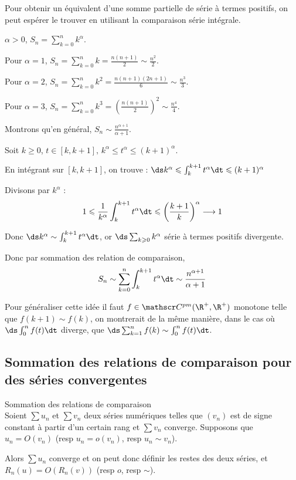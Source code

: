 \begin{exemple}
    Pour obtenir un équivalent d'une somme partielle de série à termes positifs, 
    on peut espérer le trouver en utilisant la comparaison série intégrale.

    $\alpha > 0$, $\displaystyle S_n = \sum_{k = 0 }^{n } k^\alpha$. 

    Pour $\alpha = 1$, $\displaystyle S_n = \sum_{k = 0 }^{n } k = \frac{n(n + 1)}{2} \sim \frac{n^2}{2}$.

    Pour $\alpha = 2$, $\displaystyle S_n = \sum_{k = 0 }^{n } k^2 = \frac{n(n + 1)(2n + 1)}{6} \sim \frac{n^3}{3}$.

    Pour $\alpha = 3$, $\displaystyle S_n = \sum_{k = 0 }^{n } k^3 = \left( \frac{n(n + 1)}{2} \right)^2 \sim \frac{n^4}{4}$.

    Montrons qu'en général, $\displaystyle S_n \sim \frac{n^{\alpha + 1}}{\alpha + 1}$.

    Soit $k \geqslant 0$, $t \in [k, k + 1], \, k^\alpha \leqslant t^\alpha \leqslant (k + 1)^\alpha$.

    En intégrant sur $[k, k + 1]$, on trouve : $\ds k^\alpha \leqslant \int_{k}^{k + 1} t^\alpha \dt \leqslant (k + 1)^\alpha$

    Divisons par $k^\alpha$ : 
    \[1 \leqslant \frac 1 {k^\alpha} \int_{k}^{k + 1} t^\alpha \dt \leqslant \left( \frac{k+1} k \right)^\alpha \longrightarrow 1\]

    Donc $\ds k^\alpha \sim \int_{k }^{k + 1} t^\alpha \dt$, or $\ds \sum_{k \geqslant 0 } k^\alpha$ série à termes positifs divergente. 

    Donc par sommation des relation de comparaison, 
    \[S_n \sim \sum_{k = 0}^{n } \int_{k}^{k + 1} t^\alpha \dt \sim \frac{n^{\alpha + 1}}{\alpha + 1}\]
\end{exemple}

\begin{remarque}
Pour généraliser cette idée il faut $f\in  \mathscr C^{pm}(\R^+, \R^+)$ monotone telle que $f(k+1) \sim f(k)$, on
montrerait de la même manière, dans le cas où $\ds\int_0^n f(t) \dt$ diverge, que $\ds \sum_{k=1}^n f(k) \sim \int_0^n f(t) \dt$.
\end{remarque}

\subsection{Sommation des relations de comparaison pour des séries convergentes}

\begin{theoreme}{Sommation des relations de comparaison}{}\\
    Soient $\sum u_n$ et $\sum v_n$ deux séries numériques telles que 
    $(v_n)$ est de signe constant à partir d'un certain rang et $\sum v_n$ converge.
    Supposons que $u_n = O(v_n)$ (resp $u_n = o(v_n)$, resp $u_n \sim v_n$).

    \svspace Alors $\sum u_n$ converge et on peut donc définir les restes des deux séries, et 
    $\displaystyle R_n(u) = O(R_n(v))$ (resp $o$, resp $\sim$).
\end{theoreme}

